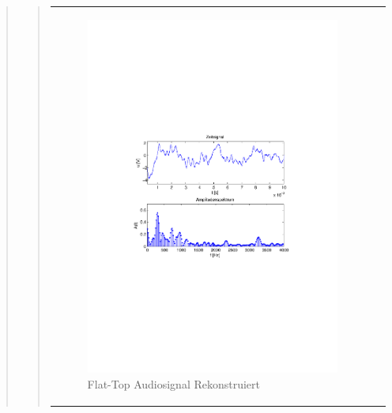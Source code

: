 \begin{quote}
\begin{quote}
\begin{center}
\begin{tabular}{ll}
                \begin{minipage}{0.6\textwidth}
                    \begin{figure}[H]
                       \includegraphics[scale=0.7, trim = 35mm 100mm 35mm 95mm, clip]{Bilder/audioflat}
                       \caption{Flat-Top Audiosignal Rekonstruiert}
		              \label{fig:flataudio}
                    \end{figure}
                \end{minipage}
            
            \end{tabular}
            \end{center}
           
    
      \end{quote}
      
      
\end{quote}










